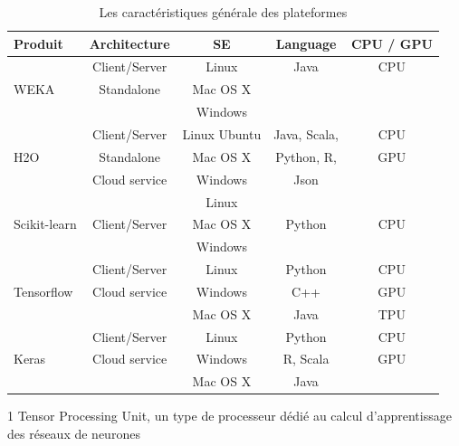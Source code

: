 \begin{table}[ht]
\begin{center}
\begin{threeparttable}[t]
\begin{tabular}{ |l|c|c|c|c| }
\hline

\hline
    \textbf{Produit} 
    & \textbf{Architecture} 
    & \textbf{SE} 
    & \textbf{Language} 
    & \textbf{CPU / GPU} \\ 
\hline

\hline
\multirow{3}{*}{WEKA}
 & {Client/Server} & {Linux} & {Java} & {CPU} \\
 & {Standalone} & {Mac OS X} & {} & {} \\
 & {} &{Windows} & {} & {}\\
 \hline
 \multirow{3}{*}{H2O}
 & {Client/Server} & {Linux Ubuntu} & {Java, Scala,} & {CPU} \\
 & {Standalone} & {Mac OS X} & {Python, R,} & {GPU} \\
 & {Cloud service} &{Windows} & {Json} & {}\\
 \hline
 \multirow{3}{*}{Scikit-learn}
 & {} & {Linux} & {} & {} \\
 & {Client/Server} & {Mac OS X} & {Python} & {CPU} \\
 & {} &{Windows} & {} & {}\\
 \hline
 \multirow{3}{*}{Tensorflow}
 & {Client/Server} & {Linux} & {Python} & {CPU} \\
 & {Cloud service} & {Windows} & {C++} & {GPU} \\
 & {} &{Mac OS X} & {Java} & {TPU\tnote{1}}\\
 \hline
 \multirow{3}{*}{Keras}
 & {Client/Server} & {Linux} & {Python} & {CPU} \\
 & {Cloud service} & {Windows} & {R, Scala} & {GPU} \\
 & {} &{Mac OS X} & {Java} & {}\\
 \hline

 \hline
\end{tabular}
\footnotesize{
            \begin{tablenotes}
                  \item[1]  Tensor Processing Unit, un type de processeur dédié au calcul d'apprentissage des réseaux de neurones
            \end{tablenotes}
        }
\end{threeparttable}
\caption{Les caractéristiques générale des plateformes}\label{comp_tabl_cg}
\end{center}
\end{table}

